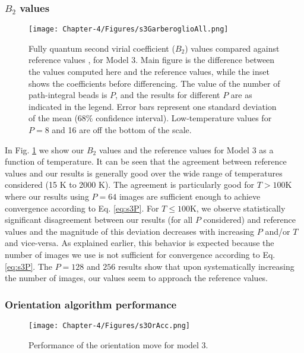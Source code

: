             \subsubsection{$B_2$ values}
                \begin{figure}[!htbp]
                    \centering
                    \texttt{[image: Chapter-4/Figures/s3GarberoglioAll.png]}
                    \caption{Fully quantum second virial coefficient ($B_2$) values compared against reference values \cite{Garberoglio2014}, for Model 3. Main figure is the difference between the values computed here and the reference values, while the inset shows the coefficients before differencing. The value of the number of path-integral beads is $P$, and the results for different $P$ are as indicated in the legend. Error bars represent one standard deviation of the mean (68\% confidence interval). Low-temperature values for $P = 8$ and 16 are off the bottom of the scale.}
                    \label{fig:variable}
                \end{figure}

                In Fig. \ref{fig:variable} we show our $B_2$ values and the reference values for Model 3 as a function of temperature. It can be seen that the agreement between reference values and our results is generally good over the wide range of temperatures considered (15 K to 2000 K). The agreement is particularly good for $T > 100 $K where our results using $P = 64$ images are sufficient enough to achieve convergence according to Eq. \eqref{eq:s3P}. For $T \le 100 $K, we observe statistically significant disagreement between our results (for all $P$ considered) and reference values and the magnitude of this deviation decreases with increasing $P$ and/or $T$ and vice-versa. As explained earlier, this behavior is expected because the number of images we use is not sufficient for convergence according to Eq. \eqref{eq:s3P}. The $P = 128$ and $256$ results show that upon systematically increasing the number of images, our values seem to approach the reference values.

            \subsubsection{Orientation algorithm performance}
                \begin{figure}[!htbp]
                    \centering
                    \texttt{[image: Chapter-4/Figures/s3OrAcc.png]}
                    \caption{Performance of the orientation move for model 3.}
                    \label{fig:variableOrAcc}
                \end{figure}


